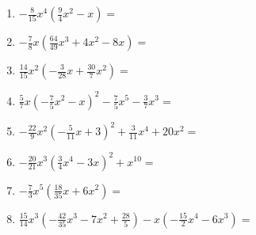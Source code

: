 \begin{Exercise}[title={Löse die Klammern auf und fasse soweit wie möglich zusammen}, label=aufloesenA1]
\begin{minipage}{\textwidth}
\begin{minipage}{0.54\textwidth}
\begin{enumerate}[label=\alph*)]
				\item \(-\frac{8}{15}x^4\left(\frac{9}{4}x^2- x\right) =\)
				\item \(-\frac{7}{8}x\left(\frac{64}{49}x^3+ 4x^2-8x\right) =\)
				\item \(\frac{14}{15}x^2\left(-\frac{3}{28}x+ \frac{30}{7}x^2\right) =\)
				\item \(\frac{5}{7}x\left(-\frac{7}{5}x^2-x \right)^2-\frac{7}{5}x^5-\frac{3}{7}x^3 =\)
				\item \(-\frac{22}{9}x^2\left(-\frac{5}{11}x+3 \right)^2 +\frac{3}{11}x^4+20x^2=\)
				\item \(-\frac{20}{21}x^3\left(\frac{3}{4}x^4-3x \right)^2+x^{10} =\)
				\item \(-\frac{7}{3}x^5\left(\frac{18}{35}x+ 6x^2\right) =\)
				\item \(\frac{15}{14}x^3\left(-\frac{42}{35}x^3-7x^2+\frac{28}{5} \right)-x\left(-\frac{15}{2}x^4-6x^3\right)=\)
			\end{enumerate}
		\end{minipage}
	\end{minipage}
\end{Exercise}
